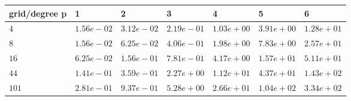 \begin{tabular}{lllllll}
\hline
 grid/degree p   & 1          & 2          & 3          & 4          & 5          & 6          \\
\hline
 $4$             & $1.56e-02$ & $3.12e-02$ & $2.19e-01$ & $1.03e+00$ & $3.91e+00$ & $1.28e+01$ \\
 $8$             & $1.56e-02$ & $6.25e-02$ & $4.06e-01$ & $1.98e+00$ & $7.83e+00$ & $2.57e+01$ \\
 $16$            & $6.25e-02$ & $1.56e-01$ & $7.81e-01$ & $4.17e+00$ & $1.57e+01$ & $5.11e+01$ \\
 $44$            & $1.41e-01$ & $3.59e-01$ & $2.27e+00$ & $1.12e+01$ & $4.37e+01$ & $1.43e+02$ \\
 $101$           & $2.81e-01$ & $9.37e-01$ & $5.28e+00$ & $2.66e+01$ & $1.04e+02$ & $3.34e+02$ \\
\hline
\end{tabular}